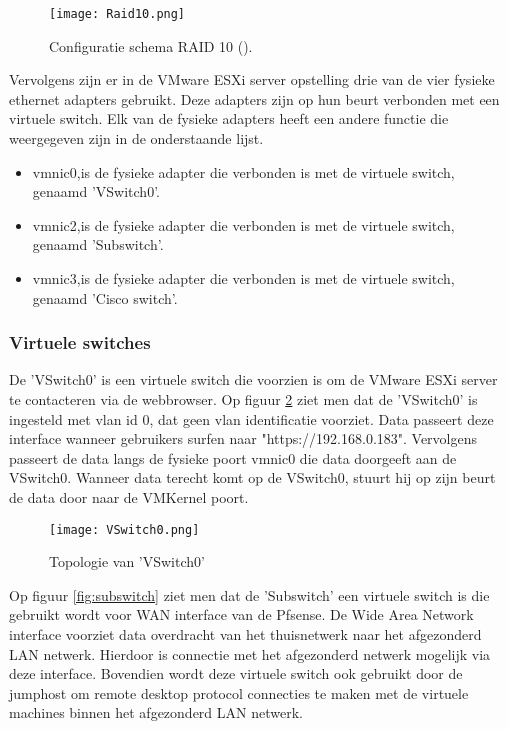 \begin{figure}[H]
	\centering
	\texttt{[image: Raid10.png]}
	\caption{Configuratie schema RAID 10 (\cite{Raid10}).}
	\label{fig:Raid10}
\end{figure}

Vervolgens zijn er in de VMware ESXi server opstelling drie van de vier fysieke ethernet adapters gebruikt. Deze adapters zijn op hun beurt verbonden met een virtuele switch. Elk van de fysieke adapters heeft een andere functie die weergegeven zijn in de onderstaande lijst. 

\begin{itemize}
	\item vmnic0,is de fysieke adapter die verbonden is met de virtuele switch, genaamd 'VSwitch0'.
	\item vmnic2,is de fysieke adapter die verbonden is met de virtuele switch, genaamd 'Sub\textunderscore switch'.
	\item vmnic3,is de fysieke adapter die verbonden is met de virtuele switch, genaamd 'Cisco \textunderscore switch'.
\end{itemize}

\newpage
\subsubsection{Virtuele switches}
\newline
De 'VSwitch0' is een virtuele switch die voorzien is om de VMware ESXi server te contacteren via de webbrowser. Op figuur \ref{fig:Vswitch0} ziet men dat de 'VSwitch0' is ingesteld met vlan id 0, dat geen vlan identificatie voorziet. 
\newline
\newline
Data passeert deze interface wanneer gebruikers surfen naar "https://192.168.0.183". Vervolgens passeert de data langs de fysieke poort vmnic0 die data doorgeeft aan de VSwitch0. Wanneer data terecht komt op de VSwitch0, stuurt hij op zijn beurt de data door naar de VMKernel poort.

\begin{figure}[H]
	\centering
	\texttt{[image: VSwitch0.png]}
	\caption{Topologie van 'VSwitch0'}
	\label{fig:Vswitch0}
\end{figure}

\newline
Op figuur \ref{fig:subswitch} ziet men dat de 'Sub\textunderscore switch' een virtuele switch is die gebruikt wordt voor WAN interface van de Pfsense. De Wide Area Network interface voorziet data overdracht van het thuisnetwerk naar het afgezonderd LAN netwerk. Hierdoor is connectie met het afgezonderd netwerk mogelijk via deze interface. Bovendien wordt deze virtuele switch ook gebruikt door de jumphost om remote desktop protocol connecties te maken met de virtuele machines binnen het afgezonderd LAN netwerk. 


